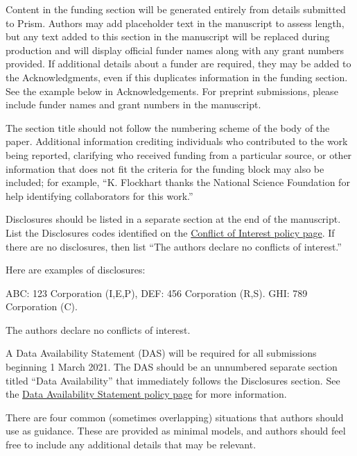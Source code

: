 \documentclass[9pt,twocolumn,twoside]{opticajnl}
\begin{document}
\begin{backmatter}
   Content in the funding section will be generated entirely from details submitted to Prism. Authors may add placeholder text in the manuscript to assess length, but any text added to this section in the manuscript will be replaced during production and will display official funder names along with any grant numbers provided. If additional details about a funder are required, they may be added to the Acknowledgments, even if this duplicates information in the funding section. See the example below in Acknowledgements. For preprint submissions, please include funder names and grant numbers in the manuscript.

   The section title should not follow the numbering scheme of the body of the paper. Additional information crediting individuals who contributed to the work being reported, clarifying who received funding from a particular source, or other information that does not fit the criteria for the funding block may also be included; for example, ``K. Flockhart thanks the National Science Foundation for help identifying collaborators for this work.''

   Disclosures should be listed in a separate section at the end of the manuscript. List the Disclosures codes identified on the \href{https://opg.optica.org/submit/review/conflicts-interest-policy.cfm}{Conflict of Interest policy page}. If there are no disclosures, then list ``The authors declare no conflicts of interest.''

  \smallskip

  \noindent Here are examples of disclosures:


   ABC: 123 Corporation (I,E,P), DEF: 456 Corporation (R,S). GHI: 789 Corporation (C).

   The authors declare no conflicts of interest.


   A Data Availability Statement (DAS) will be required for all submissions beginning 1 March 2021. The DAS should be an unnumbered separate section titled ``Data Availability'' that
  immediately follows the Disclosures section. See the \href{https://opg.optica.org/submit/review/data-availability-policy.cfm}{Data Availability Statement policy page} for more information.

  There are four common (sometimes overlapping) situations that authors should use as guidance. These are provided as minimal models, and authors should feel free to
  include any additional details that may be relevant.




\end{backmatter}
\end{document}
